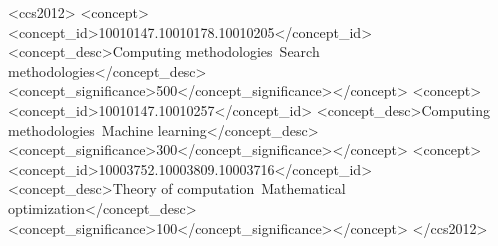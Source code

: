 \documentclass[sigconf,nonacm]{acmart}
\begin{document}
\begin{CCSXML}
<ccs2012>
<concept><concept_id>10010147.10010178.10010205</concept_id>
<concept_desc>Computing methodologies~Search methodologies</concept_desc>
<concept_significance>500</concept_significance></concept>
<concept><concept_id>10010147.10010257</concept_id>
<concept_desc>Computing methodologies~Machine learning</concept_desc>
<concept_significance>300</concept_significance></concept>
<concept><concept_id>10003752.10003809.10003716</concept_id>
<concept_desc>Theory of computation~Mathematical optimization</concept_desc>
<concept_significance>100</concept_significance></concept>
</ccs2012>
\end{CCSXML}


\maketitle















\end{document}
